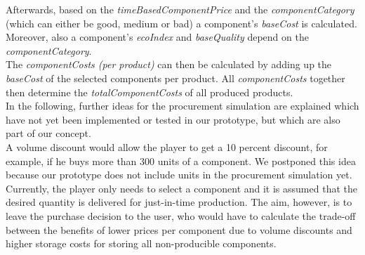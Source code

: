 Afterwards, based on the \textit{timeBasedComponentPrice} and the \textit{componentCategory} (which can either be good, medium or bad) a component's \textit{baseCost} is calculated. Moreover, also a component's \textit{ecoIndex} and \textit{baseQuality} depend on the \textit{componentCategory}.\\
The \textit{componentCosts (per product)} can then be calculated by adding up the \textit{baseCost} of the selected components per product. All \textit{componentCosts} together then determine the \textit{totalComponentCosts} of all produced products.\\

In the following, further ideas for the procurement simulation are explained which have not yet been implemented or tested in our prototype, but which are also part of our concept.\\
A volume discount would allow the player to get a 10 percent discount, for example, if he buys more than 300 units of a component. We postponed this idea because our prototype does not include units in the procurement simulation yet. Currently, the player only needs to select a component and it is assumed that the desired quantity is delivered for just-in-time production. 
The aim, however, is to leave the purchase decision to the user, who would have to calculate the trade-off between the benefits of lower prices per component due to volume discounts and higher storage costs for storing all non-producible components.